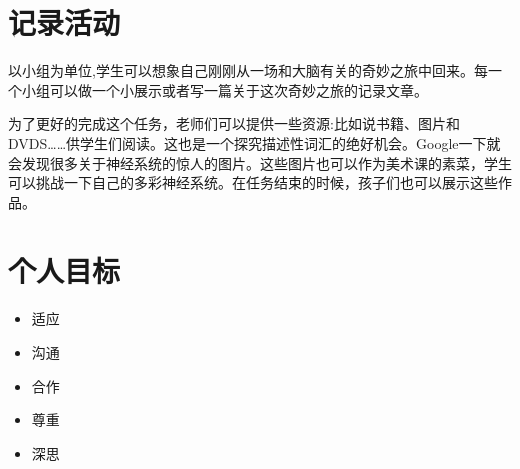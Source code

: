 \section{记录活动}
    以小组为单位,学生可以想象自己刚刚从一场和大脑有关的奇妙之旅中回来。每一个小组可以做一个小展示或者写一篇关于这次奇妙之旅的记录文章。\par
    为了更好的完成这个任务，老师们可以提供一些资源:比如说书籍、图片和DVDS……供学生们阅读。这也是一个探究描述性词汇的绝好机会。Google一下就会发现很多关于神经系统的惊人的图片。这些图片也可以作为美术课的素菜，学生可以挑战一下自己的多彩神经系统。在任务结束的时候，孩子们也可以展示这些作品。

\section{个人目标}
    \begin{itemize}
      \item 适应
      \item 沟通
      \item 合作  
      \item 尊重
      \item 深思 
    \end{itemize}  

